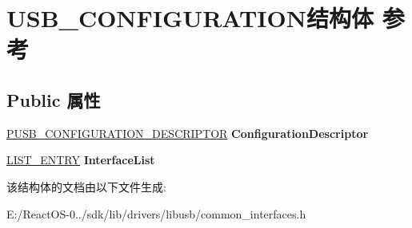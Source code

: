 \hypertarget{struct_u_s_b___c_o_n_f_i_g_u_r_a_t_i_o_n}{}\section{U\+S\+B\+\_\+\+C\+O\+N\+F\+I\+G\+U\+R\+A\+T\+I\+O\+N结构体 参考}
\label{struct_u_s_b___c_o_n_f_i_g_u_r_a_t_i_o_n}
\subsection*{Public 属性}
\begin{DoxyCompactItemize}
\item 
\mbox{\label{struct_u_s_b___c_o_n_f_i_g_u_r_a_t_i_o_n_a295ed3699945e6f72234512725861998}} 
\hyperlink{struct___u_s_b___c_o_n_f_i_g_u_r_a_t_i_o_n___d_e_s_c_r_i_p_t_o_r}{P\+U\+S\+B\+\_\+\+C\+O\+N\+F\+I\+G\+U\+R\+A\+T\+I\+O\+N\+\_\+\+D\+E\+S\+C\+R\+I\+P\+T\+OR} {\bfseries Configuration\+Descriptor}
\item 
\mbox{\label{struct_u_s_b___c_o_n_f_i_g_u_r_a_t_i_o_n_ab9f3a867fc691ec4be187ab47ff6ffa0}} 
\hyperlink{struct___l_i_s_t___e_n_t_r_y}{L\+I\+S\+T\+\_\+\+E\+N\+T\+RY} {\bfseries Interface\+List}
\end{DoxyCompactItemize}


该结构体的文档由以下文件生成\+:\begin{DoxyCompactItemize}
\item 
E\+:/\+React\+O\+S-\/0../sdk/lib/drivers/libusb/common\+\_\+interfaces.\+h\end{DoxyCompactItemize}
